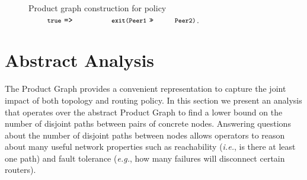 \documentclass[numbers, 10pt, preprint]{sigplanconf}
\newcommand{\EG}{\emph{e.g.}}
\newcommand{\IE}{\emph{i.e.}}
\newcommand{\CD}[1]{\texttt{\small #1}}  %
\newcommand{\KW}[1]{\texttt{\small\bfseries{#1}}}
\newcommand{\True}{\CD{true}}
\newcommand{\Prefer}{\texttt{>>}}
\newcommand{\Path}{\texttt{=>}}
\newcommand{\Exit}{\KW{exit}}
\begin{document}
\begin{figure}[t!]
\begin{minipage}[t]{.4\linewidth}
  \end{minipage}%

  \hrulefill
  \vspace*{.4em}%

  \caption{Product graph construction for policy $\True ~\Path~ \CD{\Exit(\text{Peer1}} ~\Prefer~ \CD{\text{Peer2})}$.}
  \label{fig:example-compilation}
\end{figure}


%
%
%
%


\section{Abstract Analysis}
\label{sec:analysis}

The Product Graph provides a convenient representation to capture the joint impact of both topology and routing policy. In this section we present an analysis that operates over the abstract Product Graph to find a lower bound on the number of disjoint paths between pairs of concrete nodes. Answering questions about the number of disjoint paths between nodes allows operators to reason about many useful network properties such as reachability (\IE, is there at least one path) and fault tolerance (\EG, how many failures will disconnect certain routers).


\newcommand{\inference}[7]{
    \node[draw, anchor=west] at (#1 + .5, 2.5 / 2) {#3};
    \node[] at (#1, 2.5 / 2 + 2.5) {\textbf{#5}};
    \node at (#1 + .34, .6 + .2) {#6};
    \node at (#1 + .34, 1.9 - .2) {#7};
    \node at (#1, -.6) {#2};
    \node at (#1, 2.5 + .4 + .2) {#4};
    \draw [] (#1, 2.5 - .2) circle [radius=0.4] node {$n$};
    \draw [] (#1, .2) circle [radius=0.4] node {$m$};
    \draw [->] (#1, .4 + .2) -- (#1, 2.5 - .4 - .2);
}

\newcommand{\inferencenobox}[7]{
    \node[anchor=west] at (#1 + .1, 1.25) {#3};
    \node[] at (#1, 2.5 / 2 + 2.5) {\textbf{#5}};
    \node at (#1 + .34, .6) {#6};
    \node at (#1 + .34, 1.9) {#7};
    \node at (#1, -.6) {#2};
    \node at (#1, 2.5 + .4 + .2) {#4};
    \draw [] (#1, 2.5 - .2) circle [radius=0.4] node {$n$};
    \draw [] (#1, .2) circle [radius=0.4] node {$m$};
    \draw [->] (#1, .2 + .4) -- (#1, 2.5 - .4 - .2);
}
\end{document}
